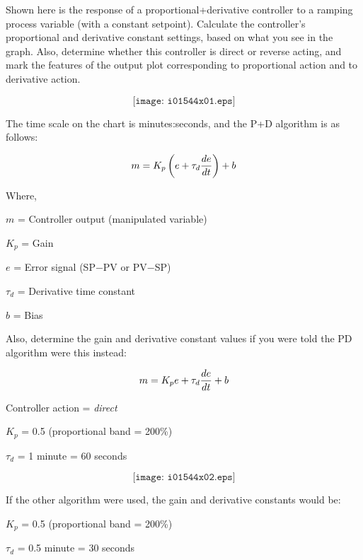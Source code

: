 

Shown here is the response of a proportional+derivative controller to a ramping process variable (with a constant setpoint).  Calculate the controller's proportional and derivative constant settings, based on what you see in the graph.  Also, determine whether this controller is direct or reverse acting, and mark the features of the output plot corresponding to proportional action and to derivative action.

$$\texttt{[image: i01544x01.eps]}$$

The time scale on the chart is minutes:seconds, and the P+D algorithm is as follows:

$$m = K_p \left( e + \tau_d {de \over dt} \right) + b$$

\noindent
Where,

$m$ = Controller output (manipulated variable)

$K_p$ = Gain

$e$ = Error signal (SP$-$PV or PV$-$SP)

$\tau_d$ = Derivative time constant

$b$ = Bias

\vskip 10pt

Also, determine the gain and derivative constant values if you were told the PD algorithm were this instead:

$$m = K_p e + \tau_d {de \over dt} + b$$







Controller action = {\it direct}

\vskip 10pt

$K_p$ = 0.5 (proportional band = 200\%)

\vskip 10pt

$\tau_d$ = 1 minute = 60 seconds

\vskip 10pt

$$\texttt{[image: i01544x02.eps]}$$

If the other algorithm were used, the gain and derivative constants would be:

\vskip 10pt

$K_p$ = 0.5 (proportional band = 200\%)

\vskip 10pt

$\tau_d$ = 0.5 minute = 30 seconds











